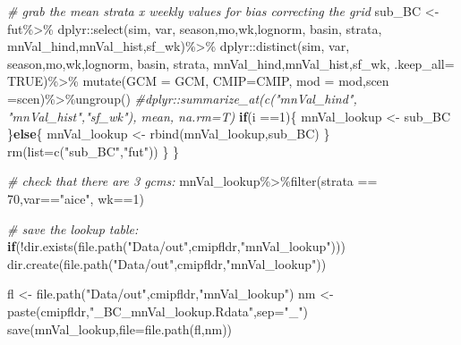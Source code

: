 \documentclass[
]{article}
\newenvironment{Shaded}{\begin{snugshade}}{\end{snugshade}}
\newcommand{\AttributeTok}[1]{\textcolor[rgb]{0.77,0.63,0.00}{#1}}
\newcommand{\CommentTok}[1]{\textcolor[rgb]{0.56,0.35,0.01}{\textit{#1}}}
\newcommand{\ConstantTok}[1]{\textcolor[rgb]{0.00,0.00,0.00}{#1}}
\newcommand{\ControlFlowTok}[1]{\textcolor[rgb]{0.13,0.29,0.53}{\textbf{#1}}}
\newcommand{\DecValTok}[1]{\textcolor[rgb]{0.00,0.00,0.81}{#1}}
\newcommand{\FunctionTok}[1]{\textcolor[rgb]{0.00,0.00,0.00}{#1}}
\newcommand{\NormalTok}[1]{#1}
\newcommand{\OtherTok}[1]{\textcolor[rgb]{0.56,0.35,0.01}{#1}}
\newcommand{\SpecialCharTok}[1]{\textcolor[rgb]{0.00,0.00,0.00}{#1}}
\newcommand{\StringTok}[1]{\textcolor[rgb]{0.31,0.60,0.02}{#1}}
\begin{document}
\begin{Shaded}
\begin{Highlighting}[]
   \CommentTok{\# grab the mean strata x weekly values for bias correcting the grid}
\NormalTok{  sub\_BC }\OtherTok{\textless{}{-}}\NormalTok{ fut}\SpecialCharTok{\%\textgreater{}\%}
\NormalTok{    dplyr}\SpecialCharTok{::}\FunctionTok{select}\NormalTok{(sim, var,  season,mo,wk,lognorm, basin, strata, mnVal\_hind,mnVal\_hist,sf\_wk)}\SpecialCharTok{\%\textgreater{}\%}
\NormalTok{    dplyr}\SpecialCharTok{::}\FunctionTok{distinct}\NormalTok{(sim, var, season,mo,wk,lognorm, basin, strata, mnVal\_hind,mnVal\_hist,sf\_wk, }\AttributeTok{.keep\_all=} \ConstantTok{TRUE}\NormalTok{)}\SpecialCharTok{\%\textgreater{}\%}
    \FunctionTok{mutate}\NormalTok{(}\AttributeTok{GCM =}\NormalTok{ GCM, }\AttributeTok{CMIP=}\NormalTok{CMIP, }\AttributeTok{mod =}\NormalTok{ mod,}\AttributeTok{scen =}\NormalTok{scen)}\SpecialCharTok{\%\textgreater{}\%}\FunctionTok{ungroup}\NormalTok{()}
   \CommentTok{\#dplyr::summarize\_at(c("mnVal\_hind", "mnVal\_hist","sf\_wk"), mean, na.rm=T)}
   \ControlFlowTok{if}\NormalTok{(i }\SpecialCharTok{==}\DecValTok{1}\NormalTok{)\{}
\NormalTok{     mnVal\_lookup }\OtherTok{\textless{}{-}}\NormalTok{ sub\_BC}
\NormalTok{   \}}\ControlFlowTok{else}\NormalTok{\{}
\NormalTok{     mnVal\_lookup }\OtherTok{\textless{}{-}} \FunctionTok{rbind}\NormalTok{(mnVal\_lookup,sub\_BC)}
\NormalTok{   \}}
    \FunctionTok{rm}\NormalTok{(}\AttributeTok{list=}\FunctionTok{c}\NormalTok{(}\StringTok{"sub\_BC"}\NormalTok{,}\StringTok{"fut"}\NormalTok{))}
\NormalTok{  \}}
\NormalTok{\}}
  
  \CommentTok{\# check that there are 3 gcms:}
\NormalTok{    mnVal\_lookup}\SpecialCharTok{\%\textgreater{}\%}\FunctionTok{filter}\NormalTok{(strata }\SpecialCharTok{==} \DecValTok{70}\NormalTok{,var}\SpecialCharTok{==}\StringTok{"aice"}\NormalTok{, wk}\SpecialCharTok{==}\DecValTok{1}\NormalTok{)}

 
  \CommentTok{\# save the lookup table:}
  \ControlFlowTok{if}\NormalTok{(}\SpecialCharTok{!}\FunctionTok{dir.exists}\NormalTok{(}\FunctionTok{file.path}\NormalTok{(}\StringTok{"Data/out"}\NormalTok{,cmipfldr,}\StringTok{"mnVal\_lookup"}\NormalTok{)))}
   \FunctionTok{dir.create}\NormalTok{(}\FunctionTok{file.path}\NormalTok{(}\StringTok{"Data/out"}\NormalTok{,cmipfldr,}\StringTok{"mnVal\_lookup"}\NormalTok{))}
    
\NormalTok{   fl }\OtherTok{\textless{}{-}} \FunctionTok{file.path}\NormalTok{(}\StringTok{"Data/out"}\NormalTok{,cmipfldr,}\StringTok{"mnVal\_lookup"}\NormalTok{)}
\NormalTok{   nm }\OtherTok{\textless{}{-}} \FunctionTok{paste}\NormalTok{(cmipfldr,}\StringTok{"\_BC\_mnVal\_lookup.Rdata"}\NormalTok{,}\AttributeTok{sep=}\StringTok{"\_"}\NormalTok{)}
   \FunctionTok{save}\NormalTok{(mnVal\_lookup,}\AttributeTok{file=}\FunctionTok{file.path}\NormalTok{(fl,nm))}
\end{Highlighting}
\end{Shaded}
\end{document}
